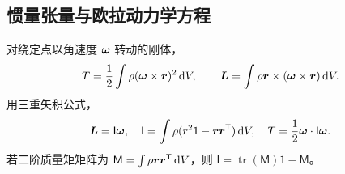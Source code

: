 \subsection{惯量张量与欧拉动力学方程}

对绕定点以角速度 $\vect\omega$ 转动的刚体，
\[
 T=\frac12\int\rho(\vect\omega\times\vect r)^2\dd V,
 \qquad
 \vect L=\int\rho\vect r\times(\vect\omega\times\vect r)\dd V.
\]
用三重矢积公式，
\begin{equation}\label{advA1:eq:inertia-tensor}
 \vect L=\mathsf I\vect\omega,
 \quad
 \mathsf I=\int\rho(r^2\mathsf 1-\vect r\vect r^{\mathsf T})\dd V,
 \quad
 T=\frac12\vect\omega\cdot\mathsf I\vect\omega.
\end{equation}
若二阶质量矩矩阵为 $\mathsf M=\int\rho\vect r\vect r^{\mathsf T}\dd V$，则
$\mathsf I=\operatorname{tr}(\mathsf M)\mathsf1-\mathsf M$。

